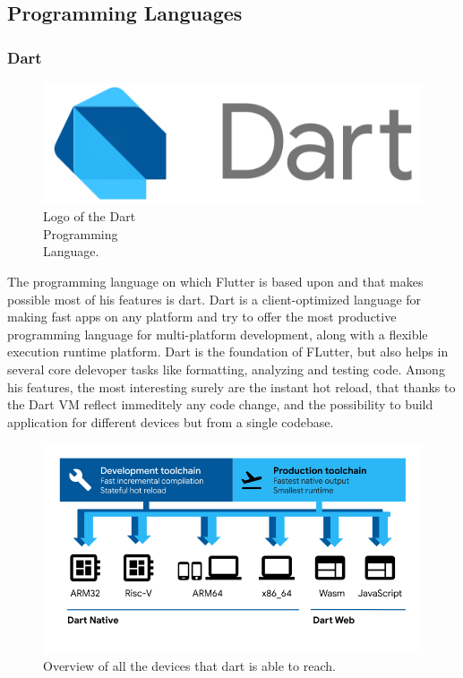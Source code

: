 \subsection{Programming Languages}
\subsubsection{Dart}
\label{subsubsec:dart}

\begin{figure} %
    \captionsetup{font=footnotesize}
    \centering
    \includegraphics[width=\linewidth]{images/dart.png}
    \caption{Logo of the Dart\\Programming\\Language.}
\end{figure}

The programming language on which Flutter is based upon and that makes possible most of his features is dart. Dart is a client-optimized language for making fast apps on any platform and try to offer the most productive programming language for multi-platform development, along with a flexible execution runtime platform. Dart is the foundation of FLutter, but also helps in several core delevoper tasks like formatting, analyzing and testing code. Among his features, the most interesting surely are the instant hot reload, that thanks to the Dart VM reflect immeditely any code change, and the possibility to build application for different devices but from a single codebase. 

\begin{figure}
    \includegraphics[width=1.0\linewidth]{./images/dart_platforms.png}
    \caption{Overview of all the devices that dart is able to reach.}
    \label{fig:dartPlatforms}
\end{figure}

